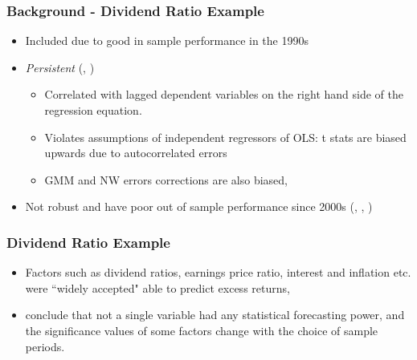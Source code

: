 \documentclass[]{beamer}
\begin{document}
\begin{frame}
\frametitle{Background - Dividend Ratio Example}
\begin{itemize}

\item Included due to good in sample performance in the 1990s \citep{goyal_predicting_2003}

\item \textit{Persistent} (\cite{goetzmann_testing_1993}, \cite{ang_stock_2006})

	\begin{itemize}
	\item Correlated with lagged dependent variables on the right hand side of the regression equation. 
	
	\item Violates assumptions of independent regressors of OLS: t stats are biased upwards due to autocorrelated errors
	
	\item GMM and NW errors corrections are also biased, \citep{goetzmann_testing_1993}
	\end{itemize}

\item Not robust and have poor out of sample performance since 2000s (\cite{goyal_predicting_2003}, \cite{lettau_consumption_2001}, \cite{schwert_anomalies_2003})
\end{itemize}
\end{frame}

\begin{frame}
\frametitle{Dividend Ratio Example}
\begin{itemize}
\item Factors such as dividend ratios, earnings price ratio, interest and inflation etc. were ``widely accepted" able to predict excess returns, \citep{lettau_consumption_2001}

\item \cite{welch_comprehensive_2008} conclude that not a single variable had any statistical forecasting power, and the significance values of some factors change with the choice of sample periods.
\end{itemize}
\end{frame}
\end{document}
